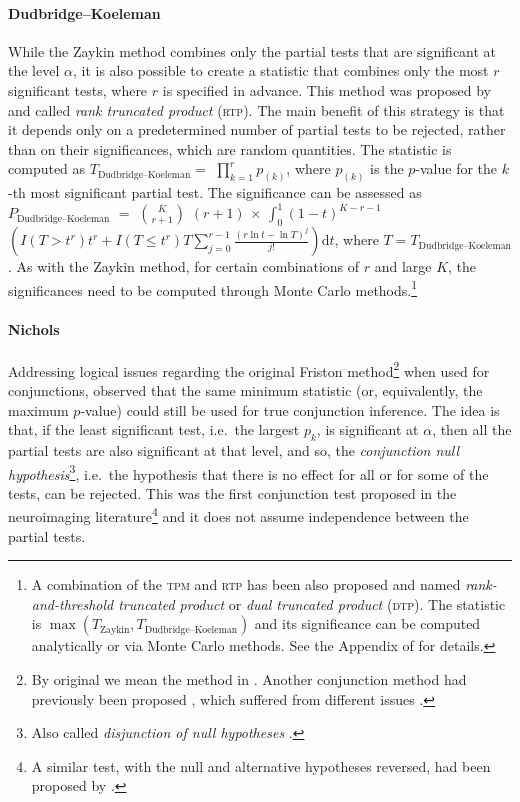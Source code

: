 \paragraph{Dudbridge--Koeleman} While the Zaykin method combines only the partial tests that are significant at the level $\alpha$, it is also possible to create a statistic that combines only the most $r$ significant tests, where $r$ is specified in advance. This method was proposed by \citet{Dudbridge2003} and called \emph{rank truncated product} (\textsc{rtp}). The main benefit of this strategy is that it depends only on a predetermined number of partial tests to be rejected, rather than on their significances, which are random quantities. The statistic is computed as $T_{\text{Dudbridge--Koeleman}}=$ $\prod_{k=1}^{r} p_{(k)}$, where $p_{(k)}$ is the $p$-value for the $k$-th most significant partial test. The significance can be assessed as $P_{\text{Dudbridge--Koeleman}}$ $=$ $\binom{K}{r+1}$ $\left(r+1\right)$ $\times$ $\int_0^1\left(1-t\right)^{K-r-1}$ $\left(I\left(T > t^{r}\right) t^{r} + I\left(T \leqslant t^{r}\right) T \sum_{j=0}^{r-1}\frac{\left(r\ln t - \ln T\right)^{j}}{j!}\right) \mathrm{d}t$, where $T=T_{\text{Dudbridge--Koeleman}}$. As with the Zaykin method, for certain combinations of $r$ and large $K$, the significances need to be computed through Monte Carlo methods.\footnote{A combination of the \textsc{tpm} and \textsc{rtp} has been also proposed and named \emph{rank-and-threshold truncated product} or \emph{dual truncated product} (\textsc{dtp}). The statistic is $\max\left(T_{\text{Zaykin}},T_{\text{Dudbridge--Koeleman}}\right)$ and its significance can be computed analytically or via Monte Carlo methods. See the Appendix of \citet{Dudbridge2003} for details.}

\paragraph{Nichols} Addressing logical issues regarding the original Friston method\footnote{By original we mean the method in \citet{Friston1999}. Another conjunction method had previously been proposed \citep{Price1997}, which suffered from different issues \citep{Caplan2004}.} when used for conjunctions, \citet{Nichols2005} observed that the same minimum statistic (or, equivalently, the maximum $p$-value) could still be used for true conjunction inference. The idea is that, if the least significant test, i.e.\ the largest $p_{k}$, is significant at $\alpha$, then all the partial tests are also significant at that level, and so, the \emph{conjunction null hypothesis}\footnote{Also called \emph{disjunction of null hypotheses} \citep{Benjamini2008}.}, i.e.\ the hypothesis that there is no effect for all or for some of the tests, can be rejected. This was the first conjunction test proposed in the neuroimaging literature\footnote{A similar test, with the null and alternative hypotheses reversed, had been proposed by \citet{Berger1982}.} and it does not assume independence between the partial tests.

